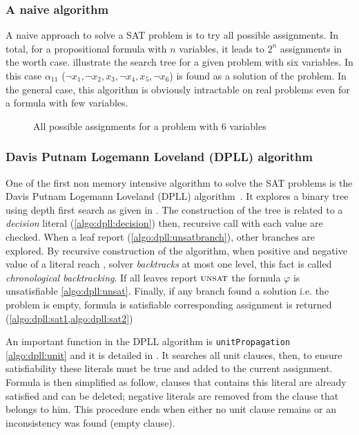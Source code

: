 \subsubsection{A naive algorithm}
A naive approach to solve a SAT problem is to try all possible assignments. In total,
for a propositional formula with $n$ variables, it leads to $2^n$ assignments in the worth case.  
 illustrate the search tree for a given problem with six variables.
In this case $\alpha_{11}$ ($\neg x_1, \neg x_2, x_3, \neg x_4, x_5, \neg x_6 $) is found as a solution of the problem. In the general case,
this algorithm is obviously intractable on real problems even for a formula with few variables.


\begin{figure}[!htbp]
	\centering
	
	\caption{All possible assignments for a problem with 6 variables}
	\label{fig:naive_algo}
\end{figure}


\subsubsection{Davis Putnam Logemann Loveland (DPLL) algorithm}\label{sec:dpll}

One of the first non memory intensive algorithm to solve the SAT problems is 
the Davis Putnam Logemann Loveland (DPLL) algorithm~\cite{dpll_62}. 
It explores a binary tree using depth first search as given in .
The construction of the tree is related to a \emph{decision} literal (\cref{algo:dpll:decision}) then,
recursive call with each value are checked.
When a leaf report \unsat (\cref{algo:dpll:unsatbranch}), other branches are explored.
By recursive construction of the algorithm, when positive and negative value of a literal reach \unsat,
solver \emph{backtracks} at most one level, this fact is called \emph{chronological backtracking}.
If all leaves report $\textsc{unsat}$  the formula $\varphi$ is unsatisfiable \cref{algo:dpll:unsat}.
Finally, if any branch found a solution  i.e. the problem is empty,
formula is satisfiable corresponding assignment is returned (\cref{algo:dpll:sat1,algo:dpll:sat2})



An important function in the DPLL algorithm is \texttt{unitPropagation} \cref{algo:dpll:unit} and
it is detailed in . It searches all unit clauses, then, to ensure satisfiability these literals must be true
and added to the current assignment. Formula is then simplified as follow, clauses that contains this literal are already satisfied
and can be deleted; negative literals are removed from the clause that belongs to him.
This procedure ends when either no unit clause remains or an inconsistency was found (empty clause).


